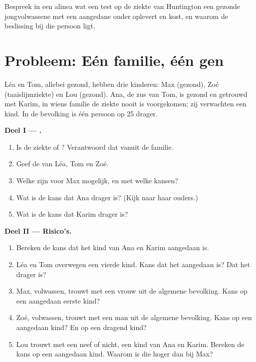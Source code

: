 \begin{exercise}[$\star\star\star$]\label{exo:g11:genes-and-disease:15}
Bespreek in een alinea wat een test op de ziekte van Huntington een
gezonde jongvolwassene met een aangedane ouder oplevert en kost, en
waarom de beslissing bij die persoon ligt.
\end{exercise}

\section{Probleem: Eén familie, één gen}

\begin{problem}
\label{pb:g11:genes-and-disease:1}
Léa en Tom, allebei gezond, hebben drie kinderen: Max (gezond), Zoé
(taaislijmziekte) en Lou (gezond). Ana, de zus van Tom, is gezond en
getrouwd met Karim, in wiens familie de ziekte nooit is voorgekomen; zij
verwachten een kind. In de bevolking is één persoon op 25 drager.

\medskip
\noindent\textbf{Deel I --- .}
\begin{enumerate}
  \item Is de ziekte  of ? Verantwoord dat vanuit de
        familie.
  \item Geef de  van Léa, Tom en Zoé.
  \item Welke  zijn voor Max mogelijk, en met welke kansen?
  \item Wat is de kans dat Ana drager is? (Kijk naar haar ouders.)
  \item Wat is de kans dat Karim drager is?
\end{enumerate}

\medskip
\noindent\textbf{Deel II --- Risico's.}
\begin{enumerate}[resume]
  \item Bereken de kans dat het kind van Ana en Karim aangedaan is.
  \item Léa en Tom overwegen een vierde kind. Kans dat het aangedaan is?
        Dat het drager is?
  \item Max, volwassen, trouwt met een vrouw uit de algemene bevolking.
        Kans op een aangedaan eerste kind?
  \item Zoé, volwassen, trouwt met een man uit de algemene bevolking.
        Kans op een aangedaan kind? En op een dragend kind?
  \item Lou trouwt met een neef of nicht, een kind van Ana en Karim.
        Bereken de kans op een aangedaan kind. Waarom is die hoger dan
        bij Max?
\end{enumerate}


\end{problem}
